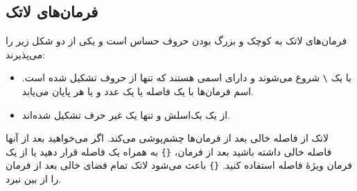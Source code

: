 \subsection{فرمان‌های لاتک}
فرمان‌های
 لاتک به کوچک و بزرگ بودن حروف حساس است و یکی از دو شکل زیر را می‌پذیرند:
\begin{itemize}
\item با یک  \verb|\| شروع می‌شوند و دارای اسمی هستند که تنها از حروف تشکیل شده است. اسم فرمان‌ها با یک فاصله یا یک عدد و یا هر 
پایان می‌یابد.
\item از یک بک‌اسلش و تنها یک غیر حرف تشکیل شده‌اند.
\end{itemize}
\label{whitespace}
لاتک از فاصله خالی بعد از فرمان‌ها چشم‌پوشی می‌کند. اگر می‌خواهید بعد از آنها فاصله خالی
 داشته باشید بعد از فرمان، \verb|{}| به همراه یک فاصله قرار دهید یا از یک فرمان ویژهٔ فاصله استفاده کنید. \verb|{}| باعث می‌شود لاتک تمام فضای خالی 
بعد از فرمان را از بین نبرد.
